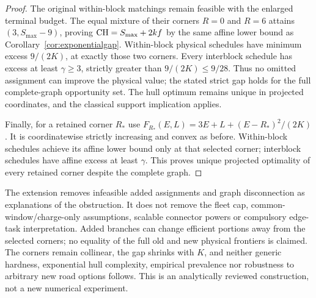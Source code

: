 \begin{proof}
The original within-block matchings remain feasible with the enlarged
terminal budget. The equal mixture of their corners $R=0$ and $R=6$
attains $(3,S_{\max}-9)$, proving $\mathrm{CH}=S_{\max}+2kf$ by the same
affine lower bound as Corollary~\ref{cor:exponentialgap}. Within-block
physical schedules have minimum excess $9/(2K)$, at exactly those two
corners. Every interblock schedule has excess at least $\gamma\ge3$,
strictly greater than $9/(2K)\le9/28$. Thus no omitted assignment can
improve the physical value; the stated strict gap holds for the full
complete-graph opportunity set. The hull optimum remains unique in
projected coordinates, and the classical support implication applies.

Finally, for a retained corner $R_*$ use
$F_{R_*}(E,L)=3E+L+(E-R_*)^2/(2K)$. It is coordinatewise strictly
increasing and convex as before. Within-block schedules achieve its
affine lower bound only at that selected corner; interblock schedules
have affine excess at least $\gamma$. This proves unique projected
optimality of every retained corner despite the complete graph.
\end{proof}

The extension removes infeasible added assignments and graph disconnection
as explanations of the obstruction. It does not remove the fleet cap,
common-window/charge-only assumptions, scalable connector powers or
compulsory edge-task interpretation. Added branches can change efficient
portions away from the selected corners; no equality of the full old
and new physical frontiers is claimed. The corners remain collinear,
the gap shrinks with $K$, and neither generic hardness, exponential hull
complexity, empirical prevalence nor robustness to arbitrary new road
options follows. This is an analytically reviewed construction, not a
new numerical experiment.
